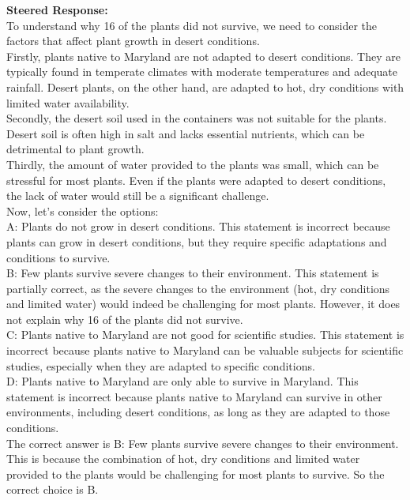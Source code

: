 \documentclass{article} %
\begin{document}
\begin{tcolorbox}[examplebox={Llama-3.2-1B-Instruct on ARC-c: both baseline and steering are correct}]
\vspace{0.5em}
\textbf{Steered Response:}\\
To understand why 16 of the plants did not survive, we need to consider the factors that affect plant growth in desert conditions.\\Firstly, plants native to Maryland are not adapted to desert conditions. They are typically found in temperate climates with moderate temperatures and adequate rainfall. Desert plants, on the other hand, are adapted to hot, dry conditions with limited water availability.\\Secondly, the desert soil used in the containers was not suitable for the plants. Desert soil is often high in salt and lacks essential nutrients, which can be detrimental to plant growth.\\Thirdly, the amount of water provided to the plants was small, which can be stressful for most plants. Even if the plants were adapted to desert conditions, the lack of water would still be a significant challenge.\\Now, let's consider the options:\\A: Plants do not grow in desert conditions. This statement is incorrect because plants can grow in desert conditions, but they require specific adaptations and conditions to survive.\\B: Few plants survive severe changes to their environment. This statement is partially correct, as the severe changes to the environment (hot, dry conditions and limited water) would indeed be challenging for most plants. However, it does not explain why 16 of the plants did not survive.\\C: Plants native to Maryland are not good for scientific studies. This statement is incorrect because plants native to Maryland can be valuable subjects for scientific studies, especially when they are adapted to specific conditions.\\D: Plants native to Maryland are only able to survive in Maryland. This statement is incorrect because plants native to Maryland can survive in other environments, including desert conditions, as long as they are adapted to those conditions.\\The correct answer is B: Few plants survive severe changes to their environment. This is because the combination of hot, dry conditions and limited water provided to the plants would be challenging for most plants to survive. \textcolor{correctcolor}{So the correct choice is B.}
\end{tcolorbox}
\end{document}
